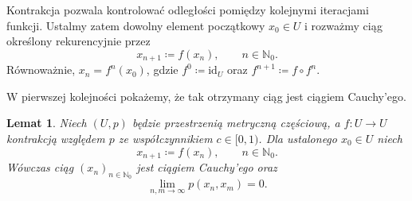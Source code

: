 \documentclass[11pt,a4paper]{article}
\theoremstyle{definition}
\theoremstyle{plain}
\newtheorem{lemat}[definicja]{Lemat}
\begin{document}
Kontrakcja pozwala kontrolować odległości pomiędzy kolejnymi iteracjami
funkcji. Ustalmy zatem dowolny element początkowy $x_0\in U$ i rozważmy
ciąg określony rekurencyjnie przez
\[
x_{n+1}\coloneqq f(x_n),
\qquad n\in\mathbb N_0.
\]
Równoważnie, $x_n=f^n(x_0)$, gdzie $f^0\coloneqq\mathrm{id}_U$ oraz
$f^{n+1}\coloneqq f\circ f^n$.

W pierwszej kolejności pokażemy, że tak otrzymany ciąg jest ciągiem
Cauchy'ego.

\begin{lemat}\label{lem:iteracje_kontrakcji_cauchy}
	Niech $(U,p)$ będzie przestrzenią metryczną częściową, a
	$f:U\to U$ kontrakcją względem $p$ ze współczynnikiem
	$c\in[0,1)$. Dla ustalonego $x_0\in U$ niech
	\[
	x_{n+1}\coloneqq f(x_n),
	\qquad n\in\mathbb N_0.
	\]
	Wówczas ciąg $(x_n)_{n\in\mathbb N_0}$ jest ciągiem Cauchy'ego oraz
	\[
	\lim_{n,m\to\infty}p(x_n,x_m)=0.
	\]
\end{lemat}
\end{document}
